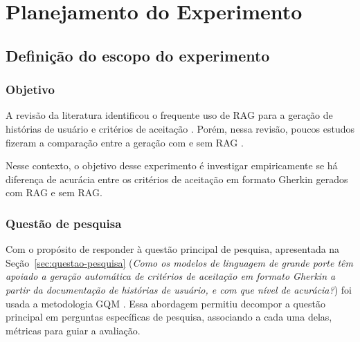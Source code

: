 \chapter[Planejamento do Experimento]{Planejamento do Experimento}
\label{cap:planejamento}

\section{Definição do escopo do experimento}
\label{sec:escopo}

\subsection{Objetivo}

A revisão da literatura identificou o frequente uso de RAG para a geração de histórias de usuário e critérios de aceitação \cite{rawson2025, rawson2025framework, rotar2025}. Porém, nessa revisão, poucos estudos fizeram a comparação entre a geração com e sem RAG \cite{wang2025}.

Nesse contexto, o objetivo desse experimento é investigar empiricamente se há diferença de acurácia entre os critérios de aceitação em formato Gherkin gerados com RAG e sem RAG.

\subsection{Questão de pesquisa}
\label{sec:quest-de-pesq}
Com o propósito de responder à questão principal de pesquisa, apresentada na Seção~\ref{sec:questao-pesquisa} (\textit{Como os modelos de linguagem de grande porte têm apoiado a geração
automática de critérios de aceitação em formato Gherkin a partir da
documentação de histórias de usuário, e com que nível de acurácia?}) foi usada a metodologia GQM \cite{basili1994}. Essa abordagem permitiu decompor a questão principal em perguntas específicas de pesquisa, associando a cada uma delas,  métricas para guiar a avaliação.

